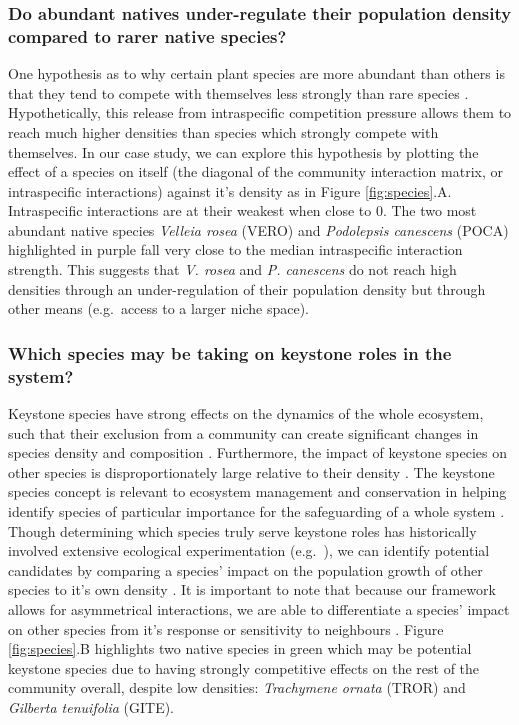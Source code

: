 \documentclass[a4,12pt]{article}
\begin{document}
    \subsubsection*{Do abundant natives under-regulate their population density compared to rarer native species?}
    One hypothesis as to why certain plant species are more abundant than others is that they tend to compete with themselves less strongly than rare species \parencite{Yenni2012, Yenni2017}. Hypothetically, this release from intraspecific competition pressure allows them to reach much higher densities than species which strongly compete with themselves. In our case study, we can explore this hypothesis by plotting the effect of a species on itself (the diagonal of the community interaction matrix, or intraspecific interactions) against it's density as in Figure \ref{fig:species}.A. Intraspecific interactions are at their weakest when close to $0$. The two most abundant native species \textit{Velleia rosea} (VERO) and \textit{Podolepsis canescens} (POCA) highlighted in purple fall very close to the median intraspecific interaction strength. This suggests that \textit{V. rosea} and \textit{P. canescens} do not reach high densities through an under-regulation of their population density but through other means (e.g.\ access to a larger niche space). 

    \subsubsection*{Which species may be taking on keystone roles in the system?}
    Keystone species have strong effects on the dynamics of the whole ecosystem, such that their exclusion from a community can create significant changes in species density and composition \parencite{Paine1969}. Furthermore, the impact of keystone species on other species is disproportionately large relative to their density \parencite{Power1996, Piraino2002, Libralato2006}. The keystone species concept is  relevant to ecosystem management and conservation in helping identify species of particular importance for the safeguarding of a whole system \parencite{Soule2005a}. Though determining which species truly serve keystone roles has historically involved extensive ecological experimentation (e.g.\ \cite{Paine1992}), we can identify potential candidates by comparing a species' impact on the population growth of other species to it's own density \parencite{Libralato2006}. It is important to note that because our framework allows for asymmetrical interactions, we are able to differentiate a species' impact on other species from it's response or sensitivity to neighbours \parencite{Broekman2020}. Figure \ref{fig:species}.B highlights two native species in green which may be potential keystone species due to having strongly competitive effects on the rest of the community overall, despite  low densities: \textit{Trachymene ornata} (TROR) and \textit{Gilberta tenuifolia} (GITE). 
    
\end{document}
